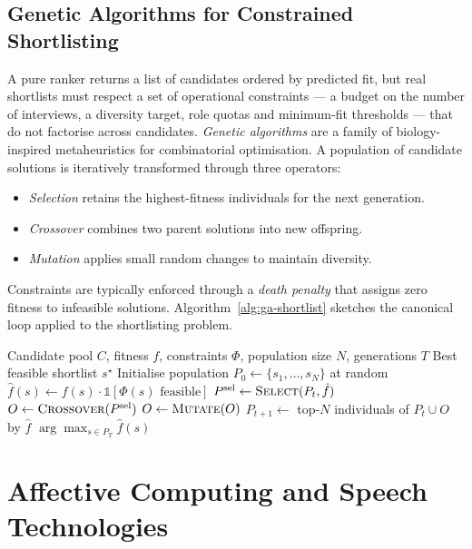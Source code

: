 \subsection{Genetic Algorithms for Constrained Shortlisting}
A pure ranker returns a list of candidates ordered by predicted fit,
but real shortlists must respect a set of operational constraints ---
a budget on the number of interviews, a diversity target, role quotas
and minimum-fit thresholds --- that do not factorise across candidates.
\emph{Genetic algorithms} are a family of biology-inspired
metaheuristics for combinatorial optimisation. A population of
candidate solutions is iteratively transformed through three operators:
\begin{itemize}
    \item \emph{Selection} retains the highest-fitness individuals
        for the next generation.
    \item \emph{Crossover} combines two parent solutions into new
        offspring.
    \item \emph{Mutation} applies small random changes to maintain
        diversity.
\end{itemize}
\noindent Constraints are typically enforced through a \emph{death
penalty} that assigns zero fitness to infeasible solutions.
Algorithm~\ref{alg:ga-shortlist} sketches the canonical loop applied to
the shortlisting problem.

\begin{algorithm}[H]
\caption{Genetic algorithm for constrained shortlisting}
\label{alg:ga-shortlist}
\begin{algorithmic}[1]
\Require Candidate pool $C$, fitness $f$, constraints $\Phi$, population size $N$, generations $T$
\Ensure Best feasible shortlist $s^{\star}$
\State Initialise population $P_0 \gets \{s_1, \dots, s_N\}$ at random
        \State $\hat{f}(s) \gets f(s) \cdot \mathbb{1}[\Phi(s) \text{ feasible}]$ 
    \EndFor
    \State $P^{\text{sel}} \gets \textsc{Select}(P_t, \hat{f})$ 
    \State $O \gets \textsc{Crossover}(P^{\text{sel}})$
    \State $O \gets \textsc{Mutate}(O)$
    \State $P_{t+1} \gets$ top-$N$ individuals of $P_t \cup O$ by $\hat{f}$
\EndFor
\State \Return $\arg\max_{s \in P_T} \hat{f}(s)$
\end{algorithmic}
\end{algorithm}

\section{Affective Computing and Speech Technologies}

